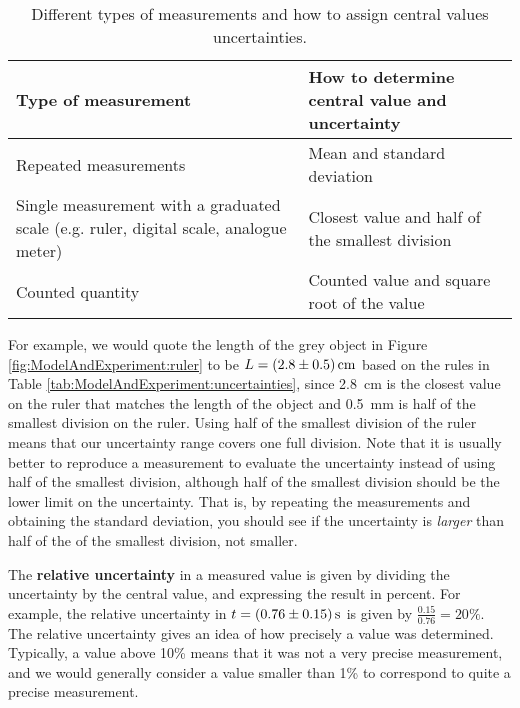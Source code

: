 \begin{table}[!h]
\centering
\begin{tabular}{p{3in}p{3in}} 
\textbf{Type of measurement} &\textbf{How to determine central value and uncertainty} \\
\hline
\hline
Repeated measurements & Mean and standard deviation \\ \hline
Single measurement with a graduated scale (e.g. ruler, digital scale, analogue meter) & Closest value and half of the smallest division\\ \hline
Counted quantity & Counted value and square root of the value \\ \hline
\end{tabular}
\caption{\label{tab:chap2:uncertainties} Different types of measurements and how to assign central values uncertainties.}
\end{table}
For example, we would quote the length of the grey object in Figure \ref{fig:ModelAndExperiment:ruler} to be $L=\SI{2.8\pm0.5}{cm}$ based on the rules in Table \ref{tab:ModelAndExperiment:uncertainties}, since \SI{2.8}{cm} is the closest value on the ruler that matches the length of the object and \SI{0.5}{mm} is half of the smallest division on the ruler. Using half of the smallest division of the ruler means that our uncertainty range covers one full division. Note that it is usually better to reproduce a measurement to evaluate the uncertainty instead of using half of the smallest division, although half of the smallest division should be the lower limit on the uncertainty. That is, by repeating the measurements and obtaining the standard deviation, you should see if the uncertainty is \textit{larger} than half of the of the smallest division, not smaller.


The \textbf{relative uncertainty} in a measured value is given by dividing the uncertainty by the central value, and expressing the result in percent. For example, the relative uncertainty in $t=\SI{0.76\pm 0.15}{s}$ is given by $\frac{0.15}{0.76}=20\%$. The relative uncertainty gives an idea of how precisely a value was determined. Typically, a value above 10\% means that it was not a very precise measurement, and we would generally consider a value smaller than 1\% to correspond to quite a precise measurement. 

